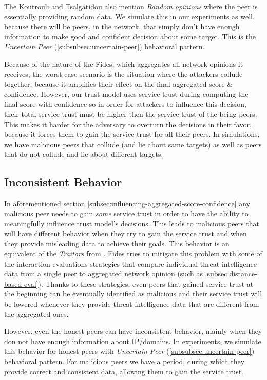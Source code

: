 The Koutrouli and Tsalgatidou \cite{KOUTROULI201247} also mention \textit{Random opinions} where the peer is essentially providing random data.
We simulate this in our experiments as well, because there will be peers, in the network, that simply don't have enough information to make good and confident decision about some target.
This is the \textit{Uncertain Peer} (\ref{subsubsec:uncertain-peer}) behavioral pattern.

Because of the nature of the Fides, which aggregates all network opinions it receives, the worst case scenario is the situation where the attackers collude together, because it amplifies their effect on the final aggregated score \& confidence.
However, our trust model uses service trust during computing the final score with confidence so in order for attackers to influence this decision, their total service trust must be higher then the service trust of the being peers.
This makes it harder for the adversary to overturn the decisions in their favor, because it forces them to gain the service trust for all their peers.
In simulations, we have malicious peers that collude (and lie about same targets) as well as peers that do not collude and lie about different targets.

\subsection{Inconsistent Behavior}
\label{subsec:inconsistent-behavior}
In aforementioned section \ref{subsec:influencing-aggregated-score-confidence} any malicious peer needs to gain \textit{some} service trust in order to have the ability to meaningfully influence trust model's decisions.
This leads to malicious peers that will have different behavior when they try to gain the service trust and when they provide misleading data to achieve their goals.
This behavior is an equivalent of the \textit{Traitors} from \cite{KOUTROULI201247}.
Fides tries to mitigate this problem with some of the interaction evaluations strategies that compare individual threat intelligence data from a single peer to aggregated network opinion (such as \ref{subsec:distance-based-eval}).
Thanks to these strategies, even peers that gained service trust at the beginning can be eventually identified as malicious and their service trust will be lowered whenever they provide threat intelligence data that are different from the aggregated ones.

However, even the honest peers can have inconsistent behavior, mainly when they don not have enough information about IP/domains.
In experiments, we simulate this behavior for honest peers with \textit{Uncertain Peer} (\ref{subsubsec:uncertain-peer}) behavioral pattern.
For malicious peers we have a period, during which they provide correct and consistent data, allowing them to gain the service trust. 

